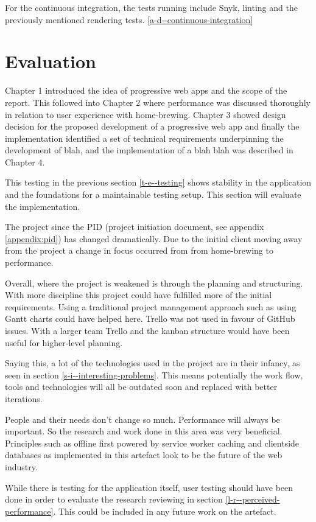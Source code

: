 For the continuous integration, the tests running include Snyk, linting and the previously mentioned rendering tests. \ref{a-d--continuous-integration}

\section{Evaluation} \label{t-e--evaluation}

Chapter 1 introduced the idea of progressive web apps and the scope of the report. This followed into Chapter 2 where performance was discussed thoroughly in relation to user experience with home-brewing. Chapter 3 showed design decision for the proposed development of a progressive web app and finally the implementation identified a set of technical requirements underpinning the development of blah, and the implementation of a blah blah was described in Chapter 4.

This testing in the previous section \ref{t-e--testing} shows stability in the application and the foundations for a maintainable testing setup. This section will evaluate the implementation.

The project since the PID (project initiation document, see appendix \ref{appendix:pid}) has changed dramatically. Due to the initial client moving away from the project a change in focus occurred from from home-brewing to performance. %

Overall, where the project is weakened is through the planning and structuring. With more discipline this project could have fulfilled more of the initial requirements. Using a traditional project management approach such as using Gantt charts could have helped here. Trello was not used in favour of GitHub issues. With a larger team Trello and the kanban structure would have been useful for higher-level planning.

Saying this, a lot of the technologies used in the project are in their infancy, as seen in section \ref{s-i--interesting-problems}. This means potentially the work flow, tools and technologies will all be outdated soon and replaced with better iterations.

People and their needs don't change so much. Performance will always be important. So the research and work done in this area was very beneficial. Principles such as offline first powered by service worker caching and clientside databases as implemented in this artefact look to be the future of the web industry.

While there is testing for the application itself, user testing should have been done in order to evaluate the research reviewing in section \ref{l-r--perceived-performance}. This could be included in any future work on the artefact.

